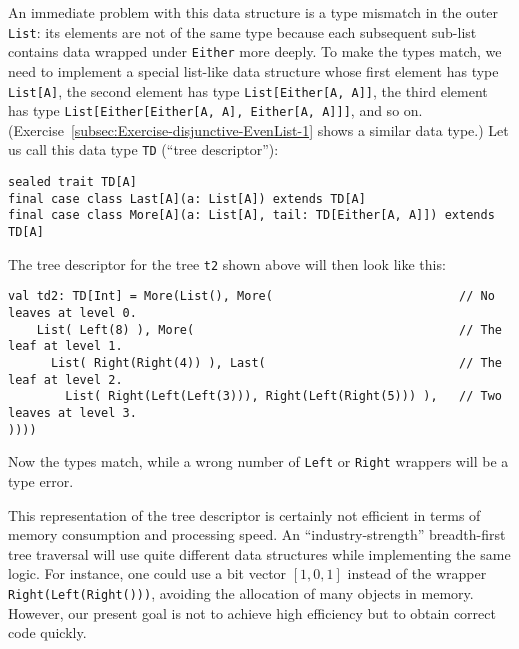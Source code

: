 An immediate problem with this data structure is a type mismatch in
the outer \lstinline!List!: its elements are not of the same type
because each subsequent sub-list contains data wrapped under \lstinline!Either!
more deeply. To make the types match, we need to implement a special
list-like data structure whose first element has type \lstinline!List[A]!,
the second element has type \lstinline!List[Either[A, A]]!, the third
element has type \lstinline!List[Either[Either[A, A], Either[A, A]]]!,
and so on. (Exercise~\ref{subsec:Exercise-disjunctive-EvenList-1}
shows a similar data type.) Let us call this data type \lstinline!TD!
(\textsf{``}tree descriptor\textsf{''}):
\begin{lstlisting}
sealed trait TD[A]
final case class Last[A](a: List[A]) extends TD[A]
final case class More[A](a: List[A], tail: TD[Either[A, A]]) extends TD[A]  
\end{lstlisting}
The tree descriptor for the tree \lstinline!t2! shown above will
then look like this:
\begin{lstlisting}
val td2: TD[Int] = More(List(), More(                          // No leaves at level 0.
    List( Left(8) ), More(                                     // The leaf at level 1.
      List( Right(Right(4)) ), Last(                           // The leaf at level 2.
        List( Right(Left(Left(3))), Right(Left(Right(5))) ),   // Two leaves at level 3.
))))
\end{lstlisting}
Now the types match, while a wrong number of \lstinline!Left! or
\lstinline!Right! wrappers will be a type error.

This representation of the tree descriptor is certainly not efficient
in terms of memory consumption and processing speed. An \textsf{``}industry-strength\textsf{''}
breadth-first tree traversal will use quite different data structures
while implementing the same logic. For instance, one could use a bit
vector $\left[1,0,1\right]$ instead of the wrapper \lstinline!Right(Left(Right()))!,
avoiding the allocation of many objects in memory. However, our present
goal is not to achieve high efficiency but to obtain correct code
quickly.

